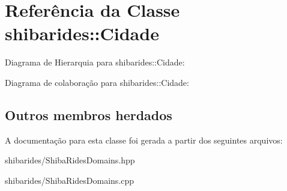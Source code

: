 \hypertarget{classshibarides_1_1Cidade}{}\section{Referência da Classe shibarides\+:\+:Cidade}
\label{classshibarides_1_1Cidade}


Diagrama de Hierarquia para shibarides\+:\+:Cidade\+:


Diagrama de colaboração para shibarides\+:\+:Cidade\+:
\subsection*{Outros membros herdados}


A documentação para esta classe foi gerada a partir dos seguintes arquivos\+:\begin{DoxyCompactItemize}
\item 
shibarides/Shiba\+Rides\+Domains.\+hpp\item 
shibarides/Shiba\+Rides\+Domains.\+cpp\end{DoxyCompactItemize}
